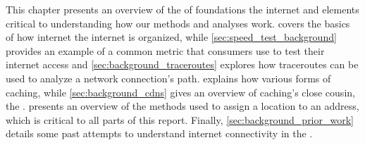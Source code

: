 This chapter presents an overview of the of foundations the internet and elements critical to understanding how our methods and analyses work.  covers the basics of how internet the internet is organized, while \cref{sec:speed_test_background} provides an example of a common metric that consumers use to test their internet access and \cref{sec:background_traceroutes} explores how traceroutes can be used to analyze a network connection's path.  explains how various forms of caching, while \cref{sec:background_cdns} gives an overview of caching's close cousin, the \cdn.  presents an overview of the methods used to assign a location to an \ip address, which is critical to all parts of this report. Finally, \cref{sec:background_prior_work} details some past attempts to understand internet connectivity in the \us.


